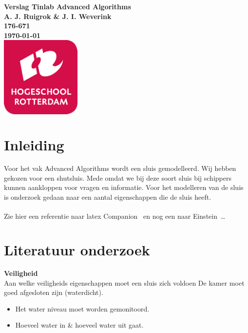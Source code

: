 \documentclass{article}
\begin{document}
\graphicspath{{../Images/}}
\sffamily
\begin{titlepage}
  \centering
    \vfill
    {\bfseries\Huge
      Verslag Tinlab Advanced Algorithms \\
        \vskip2cm
      }
      {\bfseries\Large
        A. J. Ruigrok \& J. I. Weverink\\
      }
      {
        \bfseries\normalsize
        176-671\\
        \vskip1cm
        \today\\
    }
    \vfill
    \includegraphics[width=4cm]{logohr.png} %
    \vfill
    \vfill
\end{titlepage}
\newpage
\tableofcontents

\newpage
\section{Inleiding}
Voor het vak Advanced Algorithms wordt een sluis gemodelleerd. Wij hebben gekozen voor een shutsluis. Mede omdat we bij deze soort sluis bij schippers kunnen aankloppen voor vragen en informatie. Voor het modelleren van de sluis is onderzoek gedaan naar een aantal eigenschappen die de sluis heeft.
\\\\
Zie hier een referentie naar latex Companion~\cite{latexcompanion} en nog een naar Einstein~\cite{einstein}\ldots 

\section{Literatuur onderzoek} %

\textbf{Veiligheid}\\
Aan welke veiligheids eigenschappen moet een sluis zich voldoen
De kamer moet goed afgesloten zijn (waterdicht).
\begin{itemize}
\item Het water niveau moet worden gemonitoord.
\item Hoeveel water in \& hoeveel water uit gaat.
\end{itemize}
\end{document}
